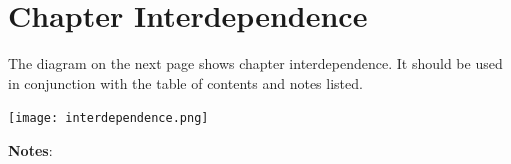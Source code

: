 \section*{Chapter Interdependence}
The diagram on the next page shows chapter interdependence. It should be used in conjunction with the table of contents and notes listed.

\newpage
\texttt{[image: interdependence.png]}

\newpage

\textbf{Notes}:
\interdependencenotes
